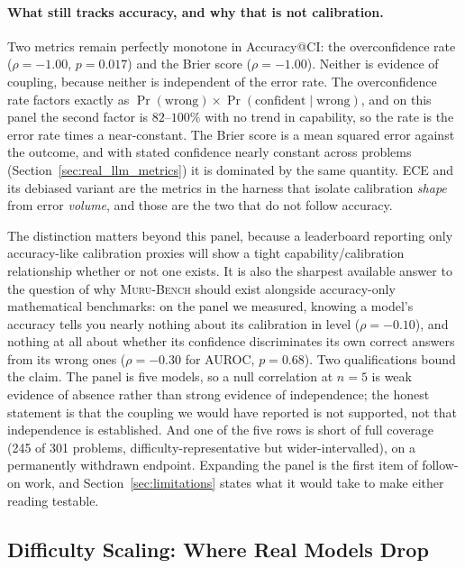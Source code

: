 \documentclass{article}
\newcommand{\muru}{\textsc{Muru-Bench}}
\begin{document}
\paragraph{What still tracks accuracy, and why that is not calibration.} Two metrics remain perfectly monotone in Accuracy@CI: the overconfidence rate ($\rho = -1.00$, $p = 0.017$) and the Brier score ($\rho = -1.00$). Neither is evidence of coupling, because neither is independent of the error rate. The overconfidence rate factors exactly as $\Pr(\text{wrong}) \times \Pr(\text{confident} \mid \text{wrong})$, and on this panel the second factor is $82$--$100\%$ with no trend in capability, so the rate is the error rate times a near-constant. The Brier score is a mean squared error against the outcome, and with stated confidence nearly constant across problems (Section~\ref{sec:real_llm_metrics}) it is dominated by the same quantity. ECE and its debiased variant are the metrics in the harness that isolate calibration \emph{shape} from error \emph{volume}, and those are the two that do not follow accuracy.

The distinction matters beyond this panel, because a leaderboard reporting only accuracy-like calibration proxies will show a tight capability/calibration relationship whether or not one exists. It is also the sharpest available answer to the question of why \muru{} should exist alongside accuracy-only mathematical benchmarks: on the panel we measured, knowing a model's accuracy tells you nearly nothing about its calibration in level ($\rho = -0.10$), and nothing at all about whether its confidence discriminates its own correct answers from its wrong ones ($\rho = -0.30$ for AUROC, $p = 0.68$). Two qualifications bound the claim. The panel is five models, so a null correlation at $n = 5$ is weak evidence of absence rather than strong evidence of independence; the honest statement is that the coupling we would have reported is not supported, not that independence is established. And one of the five rows is short of full coverage (245 of 301 problems, difficulty-representative but wider-intervalled), on a permanently withdrawn endpoint. Expanding the panel is the first item of follow-on work, and Section~\ref{sec:limitations} states what it would take to make either reading testable.

\subsection{Difficulty Scaling: Where Real Models Drop}
\label{sec:real_llm_difficulty}
\end{document}

